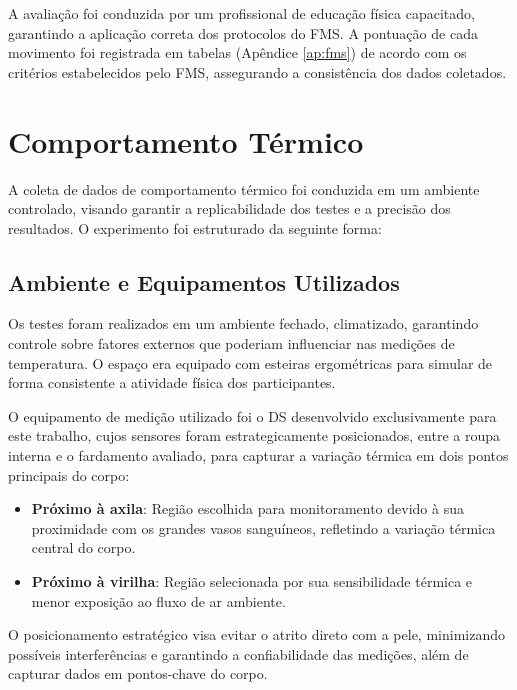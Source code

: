 A avaliação foi conduzida por um profissional de educação física capacitado, garantindo a 
aplicação correta dos protocolos do \acrshort{FMS}. A pontuação de cada movimento foi registrada 
em tabelas (Apêndice \ref{ap:fms}) de acordo com os critérios estabelecidos pelo \acrshort{FMS}, assegurando a 
consistência dos dados coletados.

\section{Comportamento Térmico}
A coleta de dados de comportamento térmico foi conduzida em um ambiente controlado, visando 
garantir a replicabilidade dos testes e a precisão dos resultados. O experimento foi 
estruturado da seguinte forma:
\subsection{Ambiente e Equipamentos Utilizados}

Os testes foram realizados em um ambiente fechado, climatizado, garantindo controle sobre fatores externos que poderiam influenciar nas medições de temperatura. O espaço era equipado com esteiras ergométricas para simular de forma consistente a atividade física dos participantes.

O equipamento de medição utilizado foi o \acrlong{DS} desenvolvido exclusivamente para este trabalho, cujos sensores foram estrategicamente posicionados, entre a roupa interna e o fardamento avaliado, para capturar a variação térmica em dois pontos principais do corpo:

\begin{itemize}
    \item \textbf{Próximo à axila}: Região escolhida para monitoramento devido à sua proximidade com os grandes vasos sanguíneos, refletindo a variação térmica central do corpo.
    \item \textbf{Próximo à virilha}: Região selecionada por sua sensibilidade térmica e menor exposição ao fluxo de ar ambiente.
\end{itemize}    

\begin{centering}
\end{centering}

O posicionamento estratégico visa evitar o atrito direto com a pele, minimizando possíveis interferências e garantindo a confiabilidade das medições, além de capturar dados em pontos-chave do corpo.

